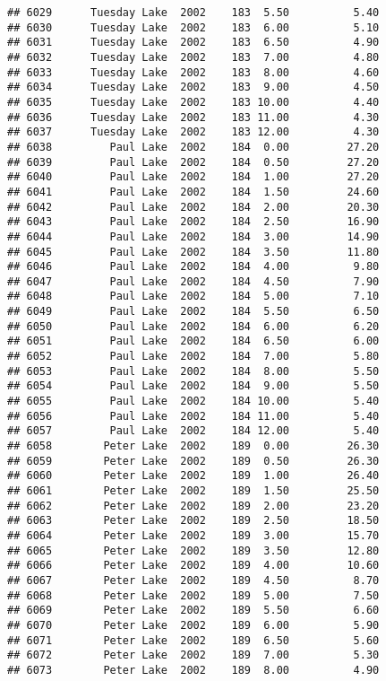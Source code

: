 \documentclass[
]{article}
\begin{document}
\begin{verbatim}
## 6029      Tuesday Lake  2002    183  5.50          5.40
## 6030      Tuesday Lake  2002    183  6.00          5.10
## 6031      Tuesday Lake  2002    183  6.50          4.90
## 6032      Tuesday Lake  2002    183  7.00          4.80
## 6033      Tuesday Lake  2002    183  8.00          4.60
## 6034      Tuesday Lake  2002    183  9.00          4.50
## 6035      Tuesday Lake  2002    183 10.00          4.40
## 6036      Tuesday Lake  2002    183 11.00          4.30
## 6037      Tuesday Lake  2002    183 12.00          4.30
## 6038         Paul Lake  2002    184  0.00         27.20
## 6039         Paul Lake  2002    184  0.50         27.20
## 6040         Paul Lake  2002    184  1.00         27.20
## 6041         Paul Lake  2002    184  1.50         24.60
## 6042         Paul Lake  2002    184  2.00         20.30
## 6043         Paul Lake  2002    184  2.50         16.90
## 6044         Paul Lake  2002    184  3.00         14.90
## 6045         Paul Lake  2002    184  3.50         11.80
## 6046         Paul Lake  2002    184  4.00          9.80
## 6047         Paul Lake  2002    184  4.50          7.90
## 6048         Paul Lake  2002    184  5.00          7.10
## 6049         Paul Lake  2002    184  5.50          6.50
## 6050         Paul Lake  2002    184  6.00          6.20
## 6051         Paul Lake  2002    184  6.50          6.00
## 6052         Paul Lake  2002    184  7.00          5.80
## 6053         Paul Lake  2002    184  8.00          5.50
## 6054         Paul Lake  2002    184  9.00          5.50
## 6055         Paul Lake  2002    184 10.00          5.40
## 6056         Paul Lake  2002    184 11.00          5.40
## 6057         Paul Lake  2002    184 12.00          5.40
## 6058        Peter Lake  2002    189  0.00         26.30
## 6059        Peter Lake  2002    189  0.50         26.30
## 6060        Peter Lake  2002    189  1.00         26.40
## 6061        Peter Lake  2002    189  1.50         25.50
## 6062        Peter Lake  2002    189  2.00         23.20
## 6063        Peter Lake  2002    189  2.50         18.50
## 6064        Peter Lake  2002    189  3.00         15.70
## 6065        Peter Lake  2002    189  3.50         12.80
## 6066        Peter Lake  2002    189  4.00         10.60
## 6067        Peter Lake  2002    189  4.50          8.70
## 6068        Peter Lake  2002    189  5.00          7.50
## 6069        Peter Lake  2002    189  5.50          6.60
## 6070        Peter Lake  2002    189  6.00          5.90
## 6071        Peter Lake  2002    189  6.50          5.60
## 6072        Peter Lake  2002    189  7.00          5.30
## 6073        Peter Lake  2002    189  8.00          4.90

\end{verbatim}
\end{document}
